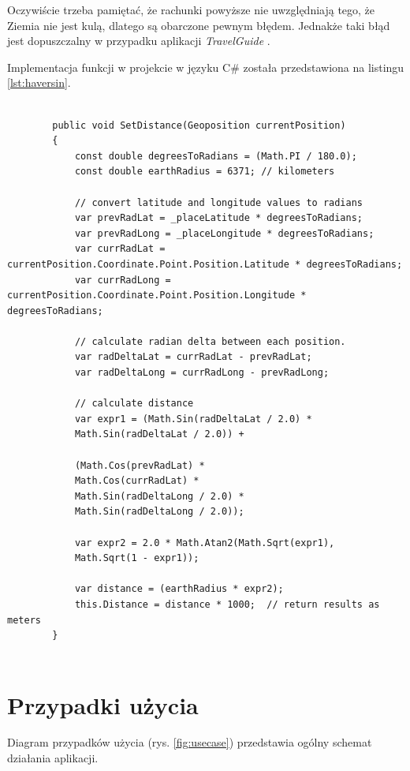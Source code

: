 \documentclass[a4paper]{book}
\newcommand{\appName}{\emph{TravelGuide} }
\begin{document}
			Oczywiście trzeba pamiętać, że rachunki powyższe nie uwzględniają tego, że Ziemia nie jest kulą, dlatego są obarczone pewnym błędem. Jednakże taki błąd jest dopuszczalny w przypadku aplikacji \appName.
			
		
		Implementacja funkcji w projekcie w języku C\# została przedstawiona na listingu \ref{lst:haversin}.
		
		\begin{lstlisting}[label={lst:haversin},caption=Funkcja obliczająca dystans pomiędzy pozycją użytkownika a punktem na mapie]
		
		public void SetDistance(Geoposition currentPosition)
		{
			const double degreesToRadians = (Math.PI / 180.0);
			const double earthRadius = 6371; // kilometers
			
			// convert latitude and longitude values to radians
			var prevRadLat = _placeLatitude * degreesToRadians;
			var prevRadLong = _placeLongitude * degreesToRadians;
			var currRadLat = currentPosition.Coordinate.Point.Position.Latitude * degreesToRadians;
			var currRadLong = currentPosition.Coordinate.Point.Position.Longitude * degreesToRadians;
			
			// calculate radian delta between each position.
			var radDeltaLat = currRadLat - prevRadLat;
			var radDeltaLong = currRadLong - prevRadLong;
			
			// calculate distance
			var expr1 = (Math.Sin(radDeltaLat / 2.0) *
			Math.Sin(radDeltaLat / 2.0)) +
			
			(Math.Cos(prevRadLat) *
			Math.Cos(currRadLat) *
			Math.Sin(radDeltaLong / 2.0) *
			Math.Sin(radDeltaLong / 2.0));
			
			var expr2 = 2.0 * Math.Atan2(Math.Sqrt(expr1),
			Math.Sqrt(1 - expr1));
			
			var distance = (earthRadius * expr2);
			this.Distance = distance * 1000;  // return results as meters
		}
		
		\end{lstlisting}


		\section{Przypadki użycia}
		\label{id:sec:przypadki_uzycia}
		Diagram przypadków użycia (rys. \ref{fig:usecase}) przedstawia ogólny schemat działania aplikacji.
		
\end{document}
